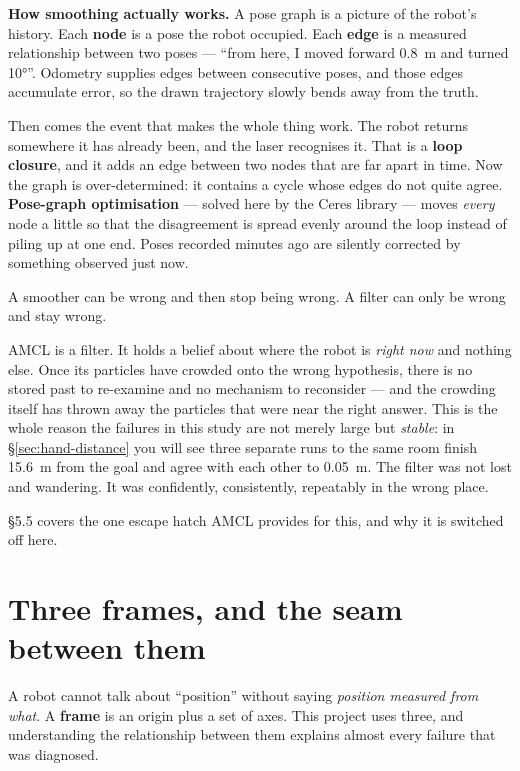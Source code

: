 \documentclass[11pt,a4paper]{report}
\newcommand{\term}[1]{\textcolor{rust}{\textbf{#1}}}
\begin{document}
\textbf{How smoothing actually works.} A pose graph is a picture of the
robot's history. Each \term{node} is a pose the robot occupied. Each
\term{edge} is a measured relationship between two poses --- ``from here, I
moved forward \SI{0.8}{\metre} and turned \ang{10}''. Odometry supplies edges
between consecutive poses, and those edges accumulate error, so the drawn
trajectory slowly bends away from the truth.

Then comes the event that makes the whole thing work. The robot returns
somewhere it has already been, and the laser recognises it. That is a
\term{loop closure}, and it adds an edge between two nodes that are far apart
in time. Now the graph is over-determined: it contains a cycle whose edges do
not quite agree. \term{Pose-graph optimisation} --- solved here by the Ceres
library --- moves \emph{every} node a little so that the disagreement is
spread evenly around the loop instead of piling up at one end. Poses recorded
minutes ago are silently corrected by something observed just now.

\begin{keyidea}
A smoother can be wrong and then stop being wrong. A filter can only be wrong
and stay wrong.

AMCL is a filter. It holds a belief about where the robot is \emph{right now}
and nothing else. Once its particles have crowded onto the wrong hypothesis,
there is no stored past to re-examine and no mechanism to reconsider --- and
the crowding itself has thrown away the particles that were near the right
answer. This is the whole reason the failures in this study are not merely
large but \emph{stable}: in \S\ref{sec:hand-distance} you will see three
separate runs to the same room finish \SI{15.6}{\metre} from the goal and
agree with each other to \SI{0.05}{\metre}. The filter was not lost and
wandering. It was confidently, consistently, repeatably in the wrong place.

\S5.5 covers the one escape hatch AMCL provides for this, and why it is
switched off here.
\end{keyidea}

\section{Three frames, and the seam between them}

A robot cannot talk about ``position'' without saying \emph{position measured
from what}. A \term{frame} is an origin plus a set of axes. This project uses
three, and understanding the relationship between them explains almost every
failure that was diagnosed.
\end{document}
